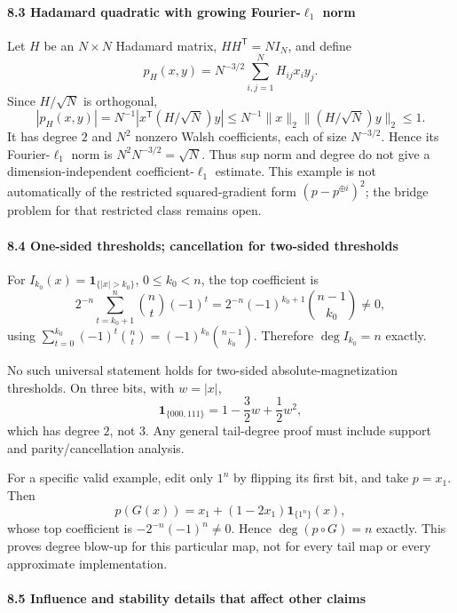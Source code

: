 \paragraph{\texorpdfstring{8.3 Hadamard quadratic with growing Fourier-\(\ell_1\) norm}{8.3 Hadamard quadratic with growing Fourier-\textbackslash ell\_1 norm}}\label{hadamard-quadratic-with-growing-fourier-ell_1-norm}

Let \(H\) be an \(N\times N\) Hadamard matrix, \(HH^{\mathsf T}=NI_N\), and define
\[p_H(x,y)=N^{-3/2}\sum_{i,j=1}^NH_{ij}x_iy_j.\]
Since \(H/\sqrt N\) is orthogonal,
\[|p_H(x,y)|=N^{-1}|x^{\mathsf T}(H/\sqrt N)y|
\le N^{-1}\|x\|_2\|(H/\sqrt N)y\|_2\le1.\]
It has degree \(2\) and \(N^2\) nonzero Walsh coefficients, each of size \(N^{-3/2}\). Hence its Fourier-\(\ell_1\) norm is \(N^2N^{-3/2}=\sqrt N\). Thus sup norm and degree do not give a dimension-independent coefficient-\(\ell_1\) estimate. This example is not automatically of the restricted squared-gradient form \((p-p^{\oplus i})^2\); the bridge problem for that restricted class remains open.

\paragraph{8.4 One-sided thresholds; cancellation for two-sided thresholds}\label{one-sided-thresholds-cancellation-for-two-sided-thresholds}

For \(I_{k_0}(x)=\mathbf1_{\{|x|>k_0\}}\), \(0\le k_0<n\), the top coefficient is
\[2^{-n}\sum_{t=k_0+1}^n\binom nt(-1)^t
=2^{-n}(-1)^{k_0+1}\binom{n-1}{k_0}\ne0,\]
using \(\sum_{t=0}^{k_0}(-1)^t\binom nt=(-1)^{k_0}\binom{n-1}{k_0}\). Therefore \(\deg I_{k_0}=n\) exactly.

No such universal statement holds for two-sided absolute-magnetization thresholds. On three bits, with \(w=|x|\),
\[\mathbf1_{\{000,111\}}=1-\frac32w+\frac12w^2,\]
which has degree \(2\), not \(3\). Any general tail-degree proof must include support and parity/cancellation analysis.

For a specific valid example, edit only \(1^n\) by flipping its first bit, and take \(p=x_1\). Then
\[p(G(x))=x_1+(1-2x_1)\mathbf1_{\{1^n\}}(x),\]
whose top coefficient is \(-2^{-n}(-1)^n\ne0\). Hence \(\deg(p\circ G)=n\) exactly. This proves degree blow-up for this particular map, not for every tail map or every approximate implementation.

\paragraph{8.5 Influence and stability details that affect other claims}\label{influence-and-stability-details-that-affect-other-claims}

